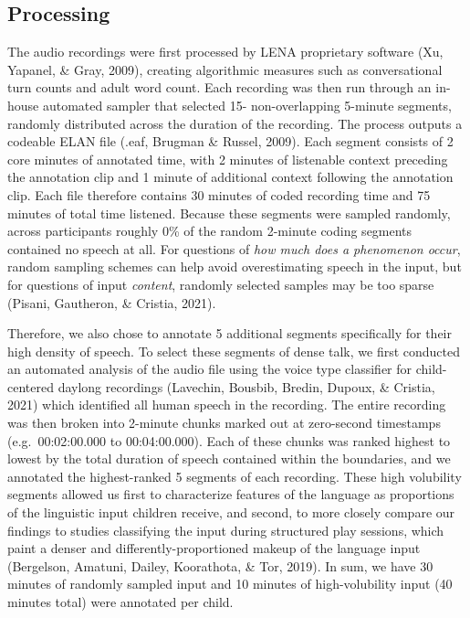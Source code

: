 \documentclass[
  man,floatsintext]{apa6}
\begin{document}
\hypertarget{processing}{%
\subsection{Processing}\label{processing}}

The audio recordings were first processed by LENA proprietary software (Xu, Yapanel, \& Gray, 2009), creating algorithmic measures such as conversational turn counts and adult word count. Each recording was then run through an in-house automated sampler that selected 15- non-overlapping 5-minute segments, randomly distributed across the duration of the recording. The process outputs a codeable ELAN file (.eaf, Brugman \& Russel, 2009). Each segment consists of 2 core minutes of annotated time, with 2 minutes of listenable context preceding the annotation clip and 1 minute of additional context following the annotation clip. Each file therefore contains 30 minutes of coded recording time and 75 minutes of total time listened. Because these segments were sampled randomly, across participants roughly 0\% of the random 2-minute coding segments contained no speech at all. For questions of \emph{how much does a phenomenon occur}, random sampling schemes can help avoid overestimating speech in the input, but for questions of input \emph{content}, randomly selected samples may be too sparse (Pisani, Gautheron, \& Cristia, 2021).

Therefore, we also chose to annotate 5 additional segments specifically for their high density of speech. To select these segments of dense talk, we first conducted an automated analysis of the audio file using the voice type classifier for child-centered daylong recordings (Lavechin, Bousbib, Bredin, Dupoux, \& Cristia, 2021) which identified all human speech in the recording. The entire recording was then broken into 2-minute chunks marked out at zero-second timestamps (e.g.~00:02:00.000 to 00:04:00.000). Each of these chunks was ranked highest to lowest by the total duration of speech contained within the boundaries, and we annotated the highest-ranked 5 segments of each recording. These high volubility segments allowed us first to characterize features of the language as proportions of the linguistic input children receive, and second, to more closely compare our findings to studies classifying the input during structured play sessions, which paint a denser and differently-proportioned makeup of the language input (Bergelson, Amatuni, Dailey, Koorathota, \& Tor, 2019). In sum, we have 30 minutes of randomly sampled input and 10 minutes of high-volubility input (40 minutes total) were annotated per child.
\end{document}
